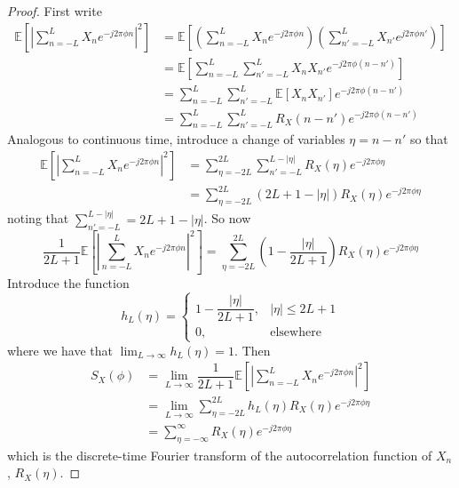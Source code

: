 \documentclass[11pt]{report} %
\begin{document}
\begin{proof}
First write
\begin{align}
\mathbb{E}\left[\left|\sum_{n=-L}^{L}X_{n}e^{-j2\pi\phi n}\right|^{2}\right] &= \mathbb{E}\left[\left(\sum_{n=-L}^{L}X_{n}e^{-j2\pi\phi n}\right)\left(\sum_{n'=-L}^{L}X_{n'}e^{j2\pi\phi n'}\right)\right] \\
&= \mathbb{E}\left[\sum_{n=-L}^{L}\sum_{n'=-L}^{L}X_{n}X_{n'}e^{-j2\pi\phi\left(n-n'\right)}\right] \\
&= \sum_{n=-L}^{L}\sum_{n'=-L}^{L}\mathbb{E}\left[X_{n}X_{n'}\right]e^{-j2\pi\phi\left(n-n'\right)} \\
&= \sum_{n=-L}^{L}\sum_{n'=-L}^{L}R_{X}\left(n-n'\right)e^{-j2\pi\phi\left(n-n'\right)}
\end{align}
Analogous to continuous time, introduce a change of variables $\eta = n - n'$ so that
\begin{align}
\mathbb{E}\left[\left|\sum_{n=-L}^{L}X_{n}e^{-j2\pi\phi n}\right|^{2}\right] &= \sum_{\eta=-2L}^{2L}\sum_{n'=-L}^{L-\left|\eta\right|}R_{X}\left(\eta\right)e^{-j2\pi\phi\eta} \\
&= \sum_{\eta=-2L}^{2L}\left(2L+1-\left|\eta\right|\right)R_{X}\left(\eta\right)e^{-j2\pi\phi\eta}
\end{align}
noting that $\sum_{n'=-L}^{L-\left|\eta\right|} = 2L + 1 - \left|\eta\right|$. So now
\begin{equation}
\dfrac{1}{2L+1}\mathbb{E}\left[\left|\sum_{n=-L}^{L}X_{n}e^{-j2\pi\phi n}\right|^{2}\right]=\sum_{\eta=-2L}^{2L}\left(1-\dfrac{\left|\eta\right|}{2L+1}\right)R_{X}\left(\eta\right)e^{-j2\pi\phi\eta}
\end{equation}
Introduce the function
\begin{equation}
h_{L}\left(\eta\right)= \begin{cases} 1-\dfrac{\left|\eta\right|}{2L+1}, & \left|\eta\right| \leq 2L + 1 \\ 0, & \mathrm{elsewhere}\end{cases}
\end{equation}
where we have that $\lim_{L\to\infty}h_{L}\left(\eta\right) = 1$. Then
\begin{align}
S_{X}\left(\phi\right) &= \lim_{L\to\infty}\dfrac{1}{2L+1}\mathbb{E}\left[\left|\sum_{n=-L}^{L}X_{n}e^{-j2\pi\phi n}\right|^{2}\right] \\
&= \lim_{L\to\infty}\sum_{\eta=-2L}^{2L}h_{L}\left(\eta\right)R_{X}\left(\eta\right)e^{-j2\pi\phi\eta} \\
&= \sum_{\eta=-\infty}^{\infty}R_{X}\left(\eta\right)e^{-j2\pi\phi\eta}
\end{align}
which is the discrete-time Fourier transform of the autocorrelation function of $X_{n}$, $R_{X}\left(\eta\right)$.
\end{proof}
\end{document}
